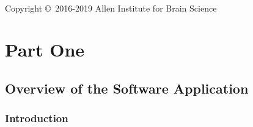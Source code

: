 \documentclass[11pt,fleqn]{book} %
\begin{document}

\newpage
~\vfill
\thispagestyle{empty}

\noindent Copyright \copyright\ 2016-2019 Allen Institute for Brain Science\\ %





\usechapterimagetrue %

\part{Part One}




\chapter{Overview of the \ate{} Software Application}
\section{Introduction}
\end{document}
